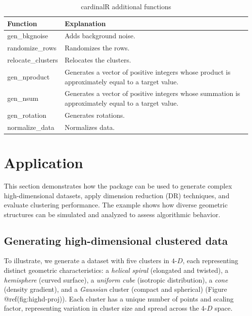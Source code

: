 \documentclass[
  11pt,
  a4paper,
]{report}
\begin{document}
\begin{table}

\caption{\label{tab:add-tb-pdf}cardinalR additional functions}
\centering
\begin{tabular}[t]{>{\raggedright\arraybackslash}p{4cm}>{\raggedright\arraybackslash}p{8cm}}
\toprule
Function & Explanation\\
\midrule
gen\_bkgnoise & Adds background noise.\\
randomize\_rows & Randomizes the rows.\\
relocate\_clusters & Relocates the clusters.\\
gen\_nproduct & Generates a vector of positive integers whose product is approximately equal to a target value.\\
gen\_nsum & Generates a vector of positive integers whose summation is approximately equal to a target value.\\
gen\_rotation & Generates rotations.\\
normalize\_data & Normalizes data.\\
\bottomrule
\end{tabular}
\end{table}

\section{Application}\label{application-1}

This section demonstrates how the package can be used to generate
complex high-dimensional datasets, apply dimension reduction (DR)
techniques, and evaluate clustering performance. The example shows how
diverse geometric structures can be simulated and analyzed to assess
algorithmic behavior.

\subsection{Generating high-dimensional clustered
data}\label{generating-high-dimensional-clustered-data}

To illustrate, we generate a dataset with five clusters in
\(4\text{-}D\), each representing distinct geometric characteristics: a
\emph{helical spiral} (elongated and twisted), a \emph{hemisphere}
(curved surface), a \emph{uniform cube} (isotropic distribution), a
\emph{cone} (density gradient), and a \emph{Gaussian} cluster (compact
and spherical) (Figure @ref(fig:highd-proj)). Each cluster has a unique
number of points and scaling factor, representing variation in cluster
size and spread across the \(4\text{-}D\) space.
\end{document}
